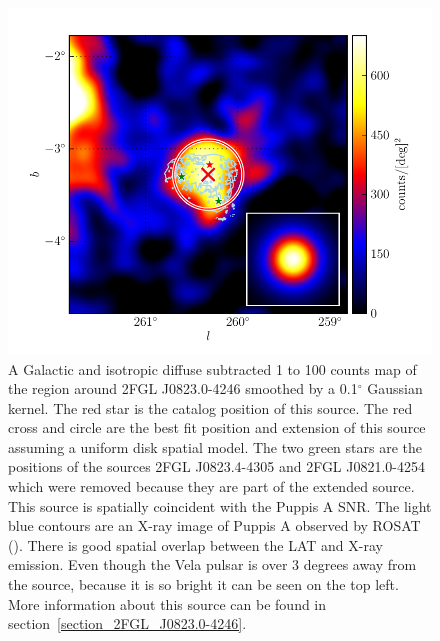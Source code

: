 \documentclass[12pt,preprint]{aastex}
\newcommand{\gev}{\text{GeV}\xspace}
\renewcommand{\deg}{\ensuremath{^\circ}\xspace}
\begin{document}
\begin{figure}
  \begin{center}
    \includegraphics[type=pdf,ext=.pdf,read=.pdf]{source_plots/source_1FGL_J0823.3-4248}
  \end{center}
  \caption{A Galactic and isotropic diffuse subtracted 1 \gev to 100
  \gev counts map of the region around 2FGL J0823.0-4246 smoothed by a
  0.1\deg Gaussian kernel.  The red star is the catalog position of this source.  
  The red cross and circle are the best fit position
  and extension of this source assuming a uniform disk spatial model.
  The two green stars are the positions of the sources 2FGL J0823.4-4305
  and 2FGL J0821.0-4254 which were removed because they are part of the
  extended source.  This source is spatially coincident with the Puppis
  A SNR. The light blue contours are an X-ray image of Puppis A observed by
  ROSAT (\cite{rosat_puppis_a}). There is good spatial overlap between
  the LAT and X-ray emission.  Even though the Vela pulsar is over 3
  degrees away from the source, because it is so bright it can be seen
  on the top left.  More information about this source can be found in 
  section~\ref{section_2FGL_J0823.0-4246}.
  }\label{1FGL_J0823.3-4248}
\end{figure}
\end{document}
